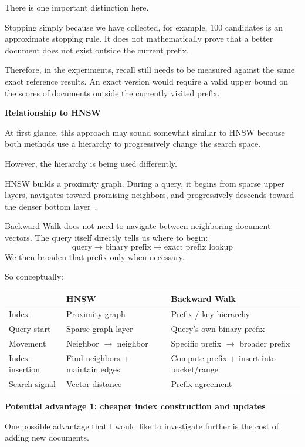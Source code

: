There is one important distinction here.

Stopping simply because we have collected, for example, 100 candidates is an approximate
stopping rule. It does not mathematically prove that a better document does not exist
outside the current prefix.

Therefore, in the experiments, recall still needs to be measured against the same exact
reference results. An exact version would require a valid upper bound on the scores of
documents outside the currently visited prefix.

\textbf{Relationship to HNSW}\par
At first glance, this approach may sound somewhat similar to HNSW because both methods use
a hierarchy to progressively change the search space.

However, the hierarchy is being used differently.

HNSW builds a proximity graph. During a query, it begins from sparse upper layers, navigates
toward promising neighbors, and progressively descends toward the denser bottom layer~\cite{hnsw}.

Backward Walk does not need to navigate between neighboring document vectors. The query
itself directly tells us where to begin:
\[
\text{query}\to\text{binary prefix}\to\text{exact prefix lookup}
\]
We then broaden that prefix only when necessary.

So conceptually:
\begin{center}\small
\begin{tabularx}{\linewidth}{@{}lYY@{}}\toprule
 & HNSW & Backward Walk\\\midrule
Index & Proximity graph & Prefix / key hierarchy\\
Query start & Sparse graph layer & Query's own binary prefix\\
Movement & Neighbor $\to$ neighbor & Specific prefix $\to$ broader prefix\\
Index insertion & Find neighbors + maintain edges & Compute prefix + insert into bucket/range\\
Search signal & Vector distance & Prefix agreement\\\bottomrule
\end{tabularx}
\end{center}

\textbf{Potential advantage 1: cheaper index construction and updates}\par
One possible advantage that I would like to investigate further is the cost of adding new documents.

